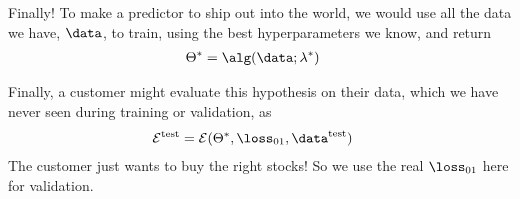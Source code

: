 Finally!  To make a predictor to ship out into the world, we would use
all the data we have, $\data$, to train, using the best
hyperparameters we know, and return 
\begin{align*}
  \Theta^* & = \alg(\data; \lambda^*) 
\end{align*}

Finally, a customer might evaluate this hypothesis on their data,
        which we have never seen during training or validation, as
\begin{align*}
\mathcal{E}^\text{test} & = \mathcal{E}(\Theta^*, \loss_{01},
                          \data^\text{test})       
\end{align*}
The customer just wants to buy the right stocks!  So we use the real
$\loss_{01}$ here for validation.



